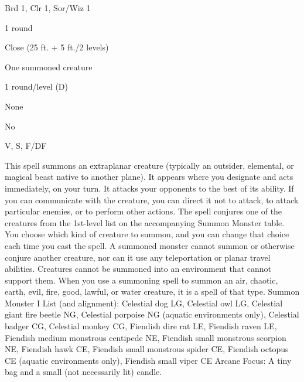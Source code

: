 
\begin{description*}
\item[Level:] Brd 1, Clr 1, Sor/Wiz 1
\item[Casting Time:] 1 round
\item[Range:] Close (25 ft. + 5 ft./2 levels)
\item[Effect:] One summoned creature
\item[Duration:] 1 round/level (D)
\item[Saving Throw:] None
\item[Spell Resistance:] No
\item[Components:] V, S, F/DF
\end{description*}

This spell summons an extraplanar creature (typically an outsider, elemental, or
magical beast native to another plane). It appears where you designate and acts
immediately, on your turn. It attacks your opponents to the best of its ability.
If you can communicate with the creature, you can direct it not to attack, to attack
particular enemies, or to perform other actions.
The spell conjures one of the creatures from the 1st-level list on the accompanying
Summon Monster table. You choose which kind of creature to summon, and you can
change that choice each time you cast the spell.
A summoned monster cannot summon or otherwise conjure another creature, nor can
it use any teleportation or planar travel abilities. Creatures cannot be summoned
into an environment that cannot support them.
When you use a summoning spell to summon an air, chaotic, earth, evil, fire, good,
lawful, or water creature, it is a spell of that type.
Summon Monster I List (and alignment): Celestial dog LG, Celestial owl LG, Celestial giant fire beetle NG, Celestial porpoise NG (aquatic environments only), Celestial badger CG, Celestial monkey CG, Fiendish dire rat LE, Fiendish raven LE, Fiendish medium monstrous centipede NE, Fiendish small monstrous scorpion NE, Fiendish hawk CE, Fiendish small monstrous spider CE, Fiendish octopus CE (aquatic environments only), Fiendish small viper CE
Arcane Focus: A tiny bag and a small (not necessarily lit) candle.